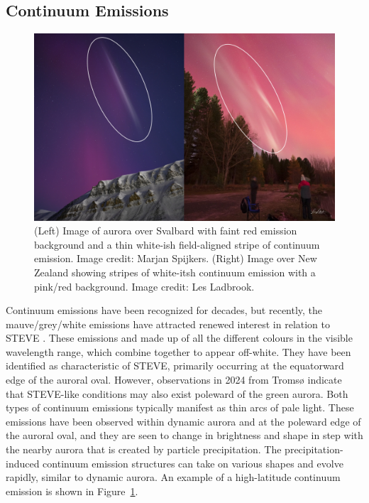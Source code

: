 \documentclass{article}
\renewcommand{\cite}[1]{\parencite{#1}}
\newcommand{\contributed}[1]{%
    \par\noindent
    \begingroup
    \setlength{\leftskip}{1em}%
    \itshape
    Contributors: #1
    \par
    \endgroup
    \vspace{0.5em}
}
\begin{document}
\subsection{Continuum Emissions}\label{continuum} 
\begin{figure}[h!]
\begin{centering}
  \includegraphics[width=\linewidth]{Fig9_Continuum.png}
  \caption{(Left) Image of aurora over Svalbard with faint red emission background and a thin white-ish field-aligned stripe of continuum emission. Image credit: Marjan Spijkers. (Right) Image over New Zealand showing stripes of white-itsh continuum emission with a pink/red background. Image credit: Les Ladbrook.}
  \label{continuumexample}
  \end{centering}
\end{figure}

Continuum emissions have been recognized for decades, but recently, the mauve/grey/white emissions have attracted renewed interest in relation to STEVE \cite{Gillies2019}. These emissions and made up of all the different colours in the visible wavelength range, which combine together to appear off-white. They have been identified as characteristic of STEVE, primarily occurring at the equatorward edge of the auroral oval. However, observations in 2024 from Tromsø \cite{Nanjo2024} indicate that STEVE-like conditions may also exist poleward of the green aurora. Both types of continuum emissions typically manifest as thin arcs of pale light. These emissions have been observed within dynamic aurora and at the poleward edge of the auroral oval, and they are seen to change in brightness and shape in step with the nearby aurora that is created by particle precipitation. The precipitation-induced continuum emission structures can take on various shapes and evolve rapidly, similar to dynamic aurora. An example of a high-latitude continuum emission is shown in Figure~\ref{continuumexample}.
\end{document}

